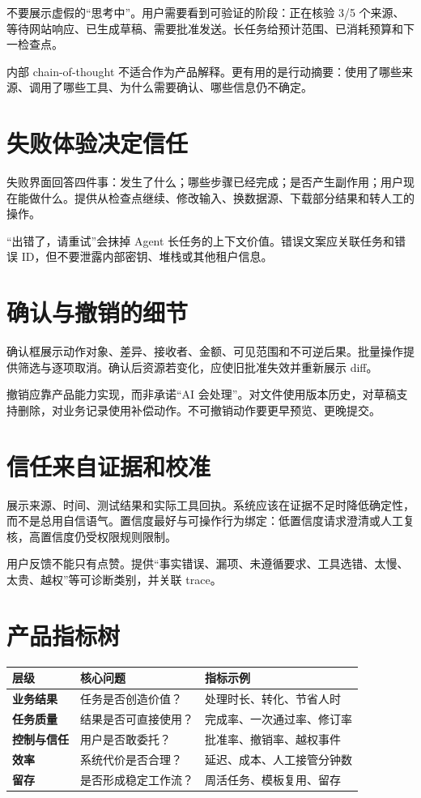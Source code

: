 不要展示虚假的“思考中”。用户需要看到可验证的阶段：正在核验 3/5 个来源、等待网站响应、已生成草稿、需要批准发送。长任务给预计范围、已消耗预算和下一检查点。

内部 chain-of-thought 不适合作为产品解释。更有用的是行动摘要：使用了哪些来源、调用了哪些工具、为什么需要确认、哪些信息仍不确定。

\section{失败体验决定信任}

失败界面回答四件事：发生了什么；哪些步骤已经完成；是否产生副作用；用户现在能做什么。提供从检查点继续、修改输入、换数据源、下载部分结果和转人工的操作。

“出错了，请重试”会抹掉 Agent 长任务的上下文价值。错误文案应关联任务和错误 ID，但不要泄露内部密钥、堆栈或其他租户信息。

\section{确认与撤销的细节}

确认框展示动作对象、差异、接收者、金额、可见范围和不可逆后果。批量操作提供筛选与逐项取消。确认后资源若变化，应使旧批准失效并重新展示 diff。

撤销应靠产品能力实现，而非承诺“AI 会处理”。对文件使用版本历史，对草稿支持删除，对业务记录使用补偿动作。不可撤销动作要更早预览、更晚提交。

\section{信任来自证据和校准}

展示来源、时间、测试结果和实际工具回执。系统应该在证据不足时降低确定性，而不是总用自信语气。置信度最好与可操作行为绑定：低置信度请求澄清或人工复核，高置信度仍受权限规则限制。

用户反馈不能只有点赞。提供“事实错误、漏项、未遵循要求、工具选错、太慢、太贵、越权”等可诊断类别，并关联 trace。

\section{产品指标树}

\begin{table}[htbp]
\centering
\begin{tabularx}{\textwidth}{>{\bfseries}p{} X X}
\toprule
层级 & 核心问题 & 指标示例 \\
\midrule
业务结果 & 任务是否创造价值？ & 处理时长、转化、节省人时 \\
任务质量 & 结果是否可直接使用？ & 完成率、一次通过率、修订率 \\
控制与信任 & 用户是否敢委托？ & 批准率、撤销率、越权事件 \\
效率 & 系统代价是否合理？ & 延迟、成本、人工接管分钟数 \\
留存 & 是否形成稳定工作流？ & 周活任务、模板复用、留存 \\
\bottomrule
\end{tabularx}
\end{table}


